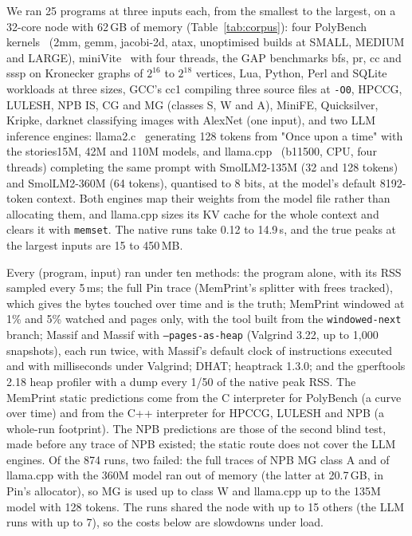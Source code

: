 \documentclass[11pt]{article}
\newcommand{\memprint}{MemPrint}
\newcommand{\tabref}[1]{Table~\ref{#1}}
\begin{document}
We ran 25 programs at three inputs each, from the smallest to the largest, on a 32-core node with 62\,GB of
memory (\tabref{tab:corpus}): four PolyBench kernels~\cite{polybench} (2mm, gemm, jacobi-2d, atax, unoptimised
builds at SMALL, MEDIUM and LARGE), miniVite~\cite{minivite} with four threads, the GAP benchmarks bfs, pr, cc
and sssp on Kronecker graphs of $2^{16}$ to $2^{18}$ vertices, Lua, Python, Perl and SQLite workloads at three
sizes, GCC's cc1 compiling three source files at \texttt{-O0}, HPCCG, LULESH, NPB IS, CG and MG (classes S, W
and A), MiniFE, Quicksilver, Kripke, darknet classifying images with AlexNet (one input), and two LLM inference
engines: llama2.c~\cite{llama2c} generating 128 tokens from "Once upon a time" with the stories15M, 42M and 110M
models, and llama.cpp~\cite{llamacpp} (b11500, CPU, four threads) completing the same prompt with SmolLM2-135M
(32 and 128 tokens) and SmolLM2-360M (64 tokens), quantised to 8 bits, at the model's default 8192-token
context. Both engines map their weights from the model file rather than allocating them, and llama.cpp sizes its
KV cache for the whole context and clears it with \texttt{memset}. The native runs take 0.12 to 14.9\,s, and the
true peaks at the largest inputs are 15 to 450\,MB.

Every (program, input) ran under ten methods: the program alone, with its RSS sampled every 5\,ms; the full Pin
trace (\memprint{}'s splitter with frees tracked), which gives the bytes touched over time and is the truth;
\memprint{} windowed at 1\% and 5\% watched and pages only, with the tool built from the
\texttt{windowed-next} branch; Massif and Massif with \texttt{--pages-as-heap} (Valgrind 3.22, up to 1{,}000
snapshots), each run twice, with Massif's default clock of instructions executed and with milliseconds under
Valgrind; DHAT; heaptrack 1.3.0; and the gperftools 2.18 heap profiler with a
dump every 1/50 of the native peak RSS. The \memprint{} static predictions come from the C interpreter for
PolyBench (a curve over time) and from the C++ interpreter for HPCCG, LULESH and NPB (a whole-run footprint).
The NPB predictions are those of the second blind test, made before any trace of NPB existed; the static route
does not cover the LLM engines. Of the 874 runs, two failed: the full traces of NPB MG class A and of llama.cpp with
the 360M model ran out of memory (the latter at 20.7\,GB, in Pin's allocator), so MG is used up to class W and
llama.cpp up to the 135M model with 128 tokens. The runs shared the node with up to 15 others (the LLM runs with
up to 7), so the costs below are slowdowns under load.
\end{document}
